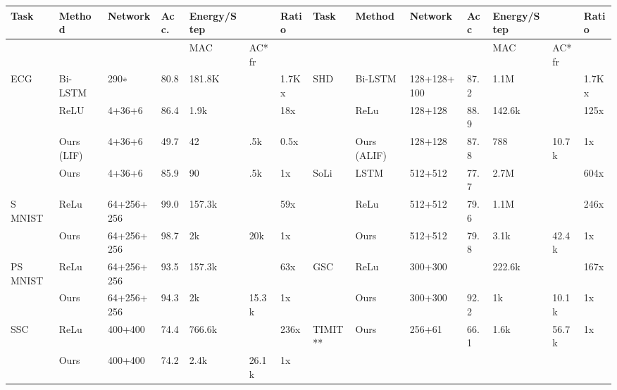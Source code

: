 \begin{tabular}{llllllllllllll}
\toprule
Task & Method & Network & Acc. & Energy/Step &  & Ratio & Task & Method & Network & Acc & Energy/Step &  & Ratio \\
\midrule
 &  &  &  & MAC & AC*fr &  &  &  &  &  & MAC & AC*fr &  \\
ECG & Bi-LSTM & 290∗ & 80.8 & 181.8K &  & 1.7Kx & SHD & Bi-LSTM & 128+128+100 & 87.2 & 1.1M &  & 1.7Kx \\
 & ReLU & 4+36+6 & 86.4 & 1.9k &  & 18x &  & ReLu & 128+128 & 88.9 & 142.6k &  & 125x \\
 & Ours (LIF) & 4+36+6 & 49.7 & 42 & .5k & 0.5x &  & Ours (ALIF) & 128+128 & 87.8 & 788 & 10.7k & 1x \\
 & Ours & 4+36+6 & 85.9 & 90 & .5k & 1x & SoLi & LSTM & 512+512 & 77.7 & 2.7M &  & 604x \\
S MNIST & ReLu & 64+256+256 & 99.0 & 157.3k &  & 59x &  & ReLu & 512+512 & 79.6 & 1.1M &  & 246x \\
 & Ours & 64+256+256 & 98.7 & 2k & 20k & 1x &  & Ours & 512+512 & 79.8 & 3.1k & 42.4k & 1x \\
PS MNIST & ReLu & 64+256+256 & 93.5 & 157.3k &  & 63x & GSC & ReLu & 300+300 &  & 222.6k &  & 167x \\
 & Ours & 64+256+256 & 94.3 & 2k & 15.3k & 1x &  & Ours & 300+300 & 92.2 & 1k & 10.1k & 1x \\
SSC & ReLu & 400+400 & 74.4 & 766.6k &  & 236x & TIMIT** & Ours & 256+61 & 66.1 & 1.6k & 56.7k & 1x \\
 & Ours & 400+400 & 74.2 & 2.4k & 26.1k & 1x &  &  &  &  &  &  &  \\
\bottomrule
\end{tabular}

